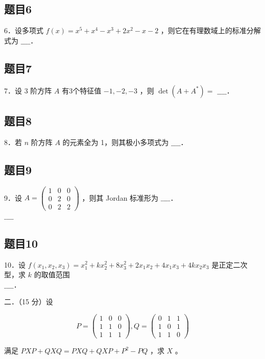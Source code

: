 \documentclass{article}
\begin{document}
\subsection{题目6}
6．设多项式 \(f(x)=x^{5}+x^{4}-x^{3}+2 x^{2}-x-2\) ，则它在有理数域上的标准分解式为 \(\_\_\_\_\)．

\subsection{题目7}
7．设 3 阶方阵 \(A\) 有3个特征值 \(-1,-2,-3\) ，则 \(\operatorname{det}\left(A+A^{*}\right)=\) \(\_\_\_\_\)．

\subsection{题目8}
8．若 \(n\) 阶方阵 \(A\) 的元素全为 1，则其极小多项式为 \(\_\_\_\_\)．

\subsection{题目9}
9．设 \(A=\left(\begin{array}{lll}1 & 0 & 0 \\ 0 & 2 & 0 \\ 0 & 2 & 2\end{array}\right)\) ，则其 Jordan 标准形为 \(\_\_\_\_\)．\\
\(\_\_\_\_\)

\subsection{题目10}
10．设 \(f\left(x_{1}, x_{2}, x_{3}\right)=x_{1}^{2}+k x_{2}^{2}+8 x_{3}^{2}+2 x_{1} x_{2}+4 x_{1} x_{3}+4 k x_{2} x_{3}\) 是正定二次型，求 \(k\) 的取值范围\\
\(\_\_\_\_\)．

二．（15 分）设

\[
P=\left(\begin{array}{lll}
1 & 0 & 0 \\
1 & 1 & 0 \\
1 & 1 & 1
\end{array}\right), Q=\left(\begin{array}{lll}
0 & 1 & 1 \\
1 & 0 & 1 \\
1 & 1 & 0
\end{array}\right)
\]

满足 \(P X P+Q X Q=P X Q+Q X P+P^{2}-P Q\) ，求 \(X\) 。
\end{document}
